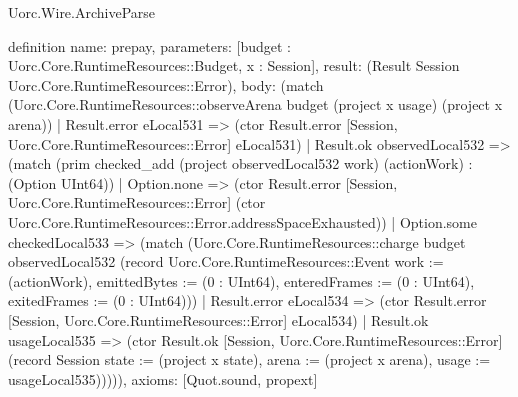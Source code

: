 \begin{lexlean}{Uorc.Wire.ArchiveParse}
\begin{semanticmodule}
definition{
  name: prepay,
  parameters: [budget : Uorc.Core.RuntimeResources::Budget, x : Session],
  result: (Result Session Uorc.Core.RuntimeResources::Error),
  body: (match (Uorc.Core.RuntimeResources::observeArena budget (project x usage) (project x arena))
    | Result.error eLocal531 => (ctor Result.error [Session, Uorc.Core.RuntimeResources::Error] eLocal531)
    | Result.ok observedLocal532 => (match (prim checked_add (project observedLocal532 work) (actionWork) : (Option UInt64))
      | Option.none => (ctor Result.error [Session, Uorc.Core.RuntimeResources::Error] (ctor Uorc.Core.RuntimeResources::Error.addressSpaceExhausted))
      | Option.some checkedLocal533 => (match (Uorc.Core.RuntimeResources::charge budget observedLocal532 (record Uorc.Core.RuntimeResources::Event {work := (actionWork), emittedBytes := (0 : UInt64), enteredFrames := (0 : UInt64), exitedFrames := (0 : UInt64)}))
        | Result.error eLocal534 => (ctor Result.error [Session, Uorc.Core.RuntimeResources::Error] eLocal534)
        | Result.ok usageLocal535 => (ctor Result.ok [Session, Uorc.Core.RuntimeResources::Error] (record Session {state := (project x state), arena := (project x arena), usage := usageLocal535}))))),
  axioms: [Quot.sound, propext]
}


\end{semanticmodule}
\end{lexlean}
